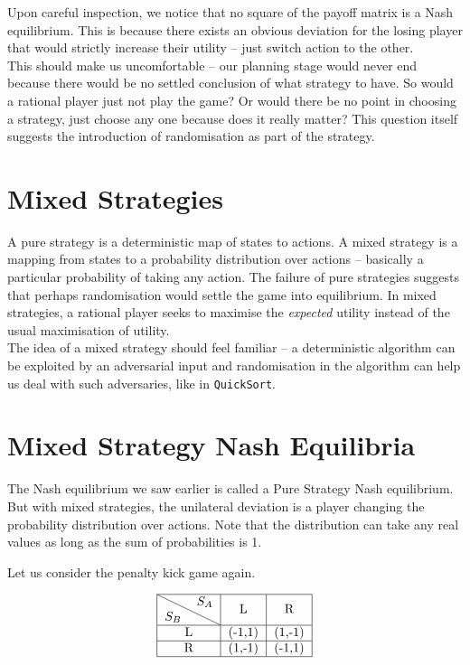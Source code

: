 Upon careful inspection, we notice that no square of the payoff matrix is a Nash equilibrium. This is 
because there exists an obvious deviation for the losing player that would 
strictly increase their utility -- just switch action to the other.\\

This should make us uncomfortable -- our planning stage would never end because there would be no 
settled conclusion of what strategy to have. So would a rational player just not play the game? Or would 
there be no point in choosing a strategy, just choose any one because does it really matter? This 
question itself suggests the introduction of randomisation as part of the strategy.

\section{Mixed Strategies}
A pure strategy is a deterministic map of states to actions. A mixed strategy is a mapping from states 
to a probability distribution over actions -- basically a particular probability of taking any action.
The failure of pure strategies suggests that perhaps randomisation would settle the game 
into equilibrium. In mixed strategies, a rational player seeks to maximise the \emph{expected} utility 
instead of the usual maximisation of utility.\\

The idea of a mixed strategy should feel familiar -- a deterministic algorithm can be 
exploited by an adversarial input and randomisation in the algorithm can help us deal with 
such adversaries, like in \texttt{QuickSort}.

\section{Mixed Strategy Nash Equilibria}
The Nash equilibrium we saw earlier is called a Pure Strategy Nash equilibrium. But with mixed strategies, 
the unilateral deviation is a player changing the probability distribution over actions. Note that 
the distribution can take any real values as long as the sum of probabilities is 1.

Let us consider the penalty kick game again. 

\[
\begin{tabular}{|c|c|c|}
\hline
\diagbox {$S_B$}{$S_A$} & \text{L} & \text{R} \\
\hline
\text{L} & (-1,1) & (1,-1) \\
\hline
\text{R} & (1,-1) & (-1,1) \\
\hline
\end{tabular}
\]


